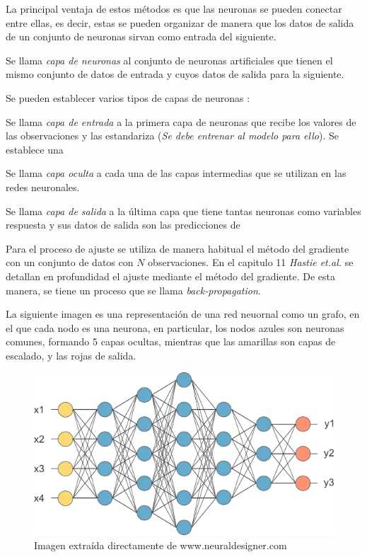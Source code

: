 \noindent La principal ventaja de estos métodos es que las neuronas se pueden conectar entre ellas, es decir, estas se pueden organizar de manera que los datos de salida de un conjunto de neuronas sirvan como entrada del siguiente.
\begin{defi}
Se llama \emph{capa de neuronas} al conjunto de neuronas artificiales que tienen el mismo conjunto de datos de entrada y cuyos datos de salida para la siguiente.
\end{defi}
\noindent Se pueden establecer varios tipos de capas de neuronas \cite{Neural Designer}:
\begin{defi}
Se llama \emph{capa de entrada} a la primera capa de neuronas que recibe los valores de las observaciones y las estandariza (\emph{Se debe entrenar al modelo para ello}). Se establece una 
\end{defi}

\begin{defi}
Se llama \emph{capa oculta} a cada una de las capas intermedias que se utilizan en las redes neuronales. 
\end{defi}

\begin{defi}
Se llama \emph{capa de salida} a la última capa que tiene tantas neuronas como variables respuesta y sus datos de salida son las predicciones de 
\end{defi}

\noindent Para el proceso de ajuste se utiliza de manera habitual el método del gradiente con un conjunto de datos con $N$ observaciones. En el capitulo  11 \emph{Hastie et.al. }\cite{Hastie 2001} se detallan en profundidad el ajuste mediante el método del gradiente. De esta manera, se tiene un proceso que se llama \emph{back-propagation}. 

\noindent La siguiente imagen es una representación de una red neuornal como un grafo, en el que cada nodo es una neurona, en particular, los nodos azules son neuronas comunes, formando 5 capas ocultas, mientras que las amarillas son capas de escalado, y las rojas de salida. 

\begin{figure}[h]
\centering
\includegraphics[scale=0.35]{Documentos Extra/Imagenes/red-neuronal-grande.png}
\caption{Imagen extraída directamente de www.neuraldesigner.com}
\end{figure}

